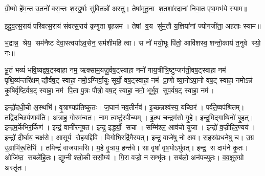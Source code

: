 ग्री॒ष्मो हे॑म॒न्त उ॒तनो॑ वस॒न्तः श॒रद्व॒र्षाः सु॑वि॒तन्नो॑ अस्तु।
तेषा॑मृतू॒ना श॒तशा॑रदानां निवा॒त ए॑षा॒मभ॑ये स्याम॥

इ॒दु॒व॒त्स॒राय॑ परिवत्स॒राय॑ संवत्स॒राय॑ कृणुता बृ॒हन्नम॑।
तेषां व॒य सु॑म॒तौ य॒ज्ञिया॑नां ज्योगजी॑ता॒ अह॑ताः स्याम॥

भ॒द्रान्न॒ श्रेय॒ सम॑नैष्ट देवा॒स्त्वया॑ऽव॒सेन॒ सम॑शीमहि त्वा।
स नो॑ मयो॒भूः पि॑तो॒ आवि॑शस्व॒ शन्तो॒काय॑ त॒नुवे स्यो॒ नः॥

भू॒तं भव्यं॑ भवि॒ष्यद्वष॒ट्स्वाहा॒ नम॒ ऋक्साम॒यजु॒र्वष॒ट्स्वाहा॒ नमो॑
गाय॒त्रीत्रि॒ष्टुप्जग॑ती॒वष॒ट्स्वाहा॒ नम॑ पृथि॒व्य॑न्तरि॑क्षम् द्यौर्वष॒ट् स्वाहा॒
नमो॒ऽग्निर्वा॒युः सूर्यो॒ वष॒ट्स्वाहा॒ नम॑ प्रा॒णो व्या॒नो॑ऽपा॒नो वष॒ट् स्वाहा॒
नमोऽन्नं॑ कृ॒षिर्वृष्टि॒र्वष॒ट् स्वाहा॒ नम॑ पि॒ता पु॒त्रः पौत्रो॒ वष॒ट् स्वाहा॒ नमो॒
भूर्भुव॒ सुव॒र्वष॒ट् स्वाहा॒ नम॑।


इन्द्रो॑दधी॒ची अ॒स्थभि॑। वृ॒त्राण्यप्र॑तिष्कुतः। ज॒घान॑ नव॒तीर्नव॑।
इ॒च्छन्नश्व॑स्य॒ यच्छिर॑। पर्व॑ते॒ष्वप॑श्रितम्। तद्वि॑दच्छिर्य॒णाव॑ति।
अत्राह॒ गोरम॑न्वत। नाम॒ त्वष्टु॑रपी॒च्यम्। इ॒त्थ च॒न्द्रम॑सो गृ॒हे।
इन्द्र॒मिद्गा॒थिनो॑ बृ॒हत्। इन्द्र॑म॒र्केभिर॒र्किण॑। इन्द्रं॒ वानी॑रनूषत।
इन्द्र॒ इद्धर्यो॒ सचा। सम्मि॑श्ल॒ आव॑चो युजा। इन्द्रो॑ व॒ज्रीहि॑र॒ण्यय॑।
इन्द्रो॑ दी॒र्घाय॒ चक्ष॑से। आसूर्य रोहयद्दि॒वि। विगोभि॒रद्रि॑मैरयत्।
इन्द्र॒ वाजे॑षु नो अव। स॒हस्र॑प्रधनेषु च। उ॒ग्र उ॒ग्राभि॑रू॒तिभि॑।
तमिन्द्रं॑ वाजयामसि। म॒हे वृ॒त्राय॒ हन्त॑वे। सा वृषा॑ वृष॒भोऽभु॑वत्।
इन्द्र॒ स दाम॑ने कृ॒तः। ओजि॑ष्ठ॒ सबले॑हि॒तः। द्युम्नी श्लो॒की ससौ॒म्य॑।
गि॒रा वज्रो॒ न सम्भृ॑तः। सब॑लो॒ अन॑पच्युतः। व॒व॒क्षुरु॒ग्रो अस्तृ॑तः।



